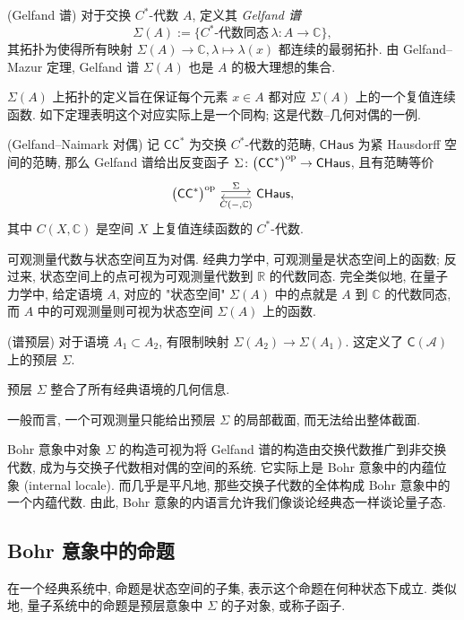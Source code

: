 \begin{definition}
    {(Gelfand 谱)}
    对于交换 $C^*$-代数 $A$, 定义其 \emph{Gelfand 谱}
$$
\Sigma(A) := \{C^*\text{-代数同态}\,\lambda\colon A \to\mathbb{C}\},
$$
其拓扑为使得所有映射 $\Sigma(A)\to\mathbb{C}, \lambda \mapsto \lambda (x)$ 都连续的最弱拓扑. 由 Gelfand--Mazur 定理, Gelfand 谱 $\Sigma(A)$ 也是 $A$ 的极大理想的集合.
\end{definition}

$\Sigma(A)$ 上拓扑的定义旨在保证每个元素 $x\in A$ 都对应 $\Sigma(A)$ 上的一个复值连续函数. 如下定理表明这个对应实际上是一个同构; 这是代数--几何对偶的一例.

\begin{prop}
    {(Gelfand--Naimark 对偶)}
    记 $\mathsf {CC}^*$ 为交换 $C^*$-代数的范畴, $\mathsf{CHaus}$ 为紧 Hausdorff 空间的范畴,
    那么 Gelfand 谱给出反变函子 $\Sigma\colon \big(\mathsf {CC}^*\big)^{\text{op}} \to \mathsf {CHaus}$, 且有范畴等价
    \[\begin{tikzcd}[ampersand replacement=\&]
    	{\big(\mathsf {CC}^*\big)^{\op}} \& {\mathsf {CHaus},}
    	\arrow["\Sigma", shift left, from=1-1, to=1-2]
    	\arrow["{C({-},\mathbb{C})}", shift left, from=1-2, to=1-1]
    \end{tikzcd}\]
    其中 $C(X,\mathbb{C})$ 是空间 $X$ 上复值连续函数的 $C^*$-代数.
\end{prop}

可观测量代数与状态空间互为对偶. 经典力学中, 可观测量是状态空间上的函数; 反过来, 状态空间上的点可视为可观测量代数到 $\mathbb{R}$ 的代数同态.
完全类似地, 在量子力学中, 给定语境 $A$, 对应的 "状态空间" $\Sigma(A)$ 中的点就是 $A$ 到 $\mathbb{C}$ 的代数同态, 而 $A$ 中的可观测量则可视为状态空间 $\Sigma(A)$ 上的函数.

\begin{definition}
    {(谱预层)}
    对于语境 $A_1 \subset A_2$, 有限制映射 $\Sigma(A_2)\to\Sigma(A_1)$. 这定义了 $\mathsf C(\mathcal A)$ 上的预层 $\Sigma$.
\end{definition}

\begin{remark}
    {}
    预层 $\Sigma$ 整合了所有经典语境的几何信息.
    
    一般而言, 一个可观测量只能给出预层 $\Sigma$ 的局部截面, 而无法给出整体截面.
\end{remark}

Bohr 意象中对象 $\Sigma$ 的构造可视为将 Gelfand 谱的构造由交换代数推广到非交换代数, 成为与交换子代数相对偶的空间的系统. 它实际上是 Bohr 意象中的内蕴位象 (internal locale). 而几乎是平凡地, 那些交换子代数的全体构成 Bohr 意象中的一个内蕴代数. 由此, Bohr 意象的内语言允许我们像谈论经典态一样谈论量子态.

\subsection{Bohr 意象中的命题}



在一个经典系统中, 命题是状态空间的子集, 表示这个命题在何种状态下成立.
类似地, 量子系统中的命题是预层意象中 $\Sigma$ 的子对象, 或称子函子.